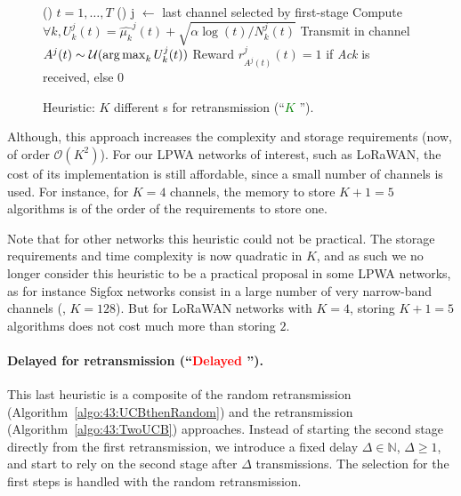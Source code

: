 \begin{figure}[h!]
	\centering
\begin{framed}
	\begin{algorithm}[H]
		\For()
		{$t = 1, \dots, T$}{
			\uElse(){ %
				j $\leftarrow$ last channel selected by first-stage \UCB\;
				Compute $\forall k, U_k^j(t) = \widehat{\mu_k}^j(t) + \sqrt{\alpha \log(t) / N_k^j(t)}$\;
				Transmit in channel $A^j(t) \sim \mathcal{U}(\operatorname*{arg\,max}_k U^j_k(t))$\;
				Reward $r^j_{A^j(t)}(t) = 1$ if \emph{Ack} is received, else $0$\;
			}
		}
		\caption[Heuristic: $K$ different {\UCB}s for retransmission.]{Heuristic: $K$ different {\UCB}s for retransmission (``\textcolor{green}{$K$ \UCB}'').}
		\label{algo:43:UCBthenKp1}
	\end{algorithm}
	\end{framed}
\end{figure}

Although, this approach increases the complexity and storage requirements (now, of order $\mathcal{O}(K^2)$).
For our LPWA networks of interest, such as LoRaWAN, the cost of its implementation is still affordable, since a small number of channels is used.
For instance, for $K=4$ channels,
the memory to store $K+1=5$ algorithms is of the order of the requirements to store one.

Note that for other networks this heuristic could not be practical.
The storage requirements and time complexity is now quadratic in $K$, and as such we no longer consider this heuristic to be a practical proposal in some LPWA networks, as for instance Sigfox networks consist in a large number of very narrow-band channels (\eg, $K=128$).
But for LoRaWAN networks with $K=4$, storing $K+1=5$ algorithms does not cost much more than storing $2$.


\paragraph{Delayed \UCB{} for retransmission (``\textcolor{red}{Delayed \UCB}'').}\label{sub:43:UCBwithDelay}
%
This last heuristic is a composite of
the random retransmission (Algorithm~\ref{algo:43:UCBthenRandom})
and the \UCB{} retransmission (Algorithm~\ref{algo:43:TwoUCB}) approaches.
Instead of starting the second stage \UCB{} directly from the first retransmission, we introduce a fixed delay $\Delta\in\mathbb{N}$, $\Delta \geq 1$,
and start to rely on the second stage \UCB{} after $\Delta$ transmissions.
The selection for the first steps is handled with the random retransmission.

